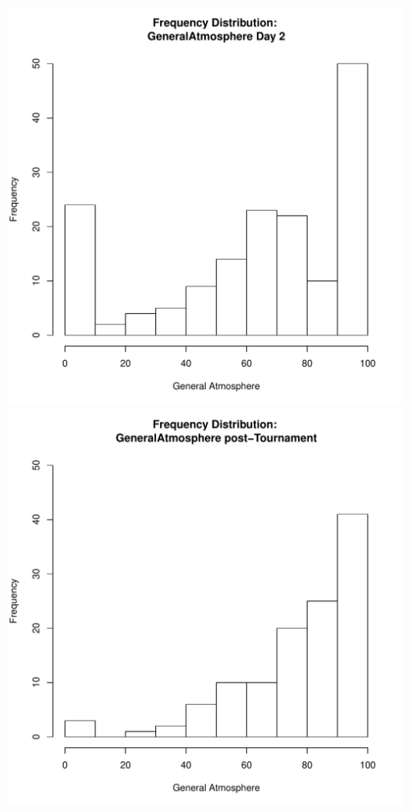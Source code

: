 \documentclass[12pt]{report}
\begin{document}
\includegraphics[scale =.4]{../images/distGeneralAtmosphereDay2.pdf}
\includegraphics[scale =.4]{../images/distGeneralAtmospherePost.pdf}
\end{document}
